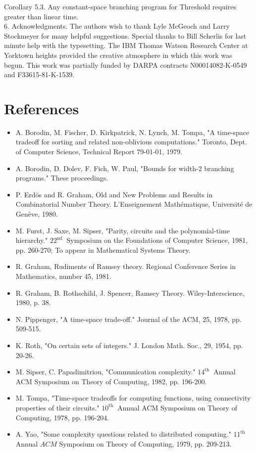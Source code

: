 \documentclass[10pt]{article}
\begin{document}
Corollary 5.3. Any constant-space branching program for Threshold requires greater than linear time.\\
6. Acknowledgments. The authors wish to thank Lyle McGeoch and Larry Stockmeyer for many helpful suggestions. Special thanks to Bill Scherlis for last minute help with the typesetting. The IBM Thomas Watson Research Center at Yorktown heights provided the creative atmosphere in which this work was begun. This work was partially funded by DARPA contracts N00014082-K-0549 and F33615-81-K-1539.

\section*{References}
\begin{itemize}
  \item[] [B] A. Borodin, M. Fischer, D. Kirkpatrick, N. Lynch, M. Tompa, "A time-space tradeoff for sorting and related non-oblivious computations." Toronto, Dept. of Computer Science, Technical Report 79-01-01, 1979.
  \item[] [BD] A. Borodin, D. Dolev, F. Fich, W. Paul, "Bounds for width-2 branching programs." These proceedings.
  \item[] [EG] P. Erdös and R. Graham, Old and New Problems and Results in Combinatorial Number Theory. L'Enseignement Mathématique, Université de Genève, 1980.
  \item[] [FSS] M. Furst, J. Saxe, M. Sipser, "Parity, circuits and the polynomial-time hierarchy." $22^{\text {nd }}$ Symposium on the Foundations of Computer Science, 1981, pp. 260-270; To appear in Mathematical Systems Theory.
  \item[] [G] R. Graham, Rudiments of Ramsey theory. Regional Conference Series in Mathematics, number 45, 1981.
  \item[] [GRS] R. Graham, B. Rothschild, J. Spencer, Ramsey Theory. Wiley-Interscience, 1980, p. 38.
  \item[] [P] N. Pippenger, "A time-space trade-off." Journal of the ACM, 25, 1978, pp. 509-515.
  \item[] [R] K. Roth, "On certain sets of integers." J. London Math. Soc., 29, 1954, pp. 20-26.
  \item[] [SP] M. Sipser, C. Papadimitriou, "Communication complexity." $14^{\text {th }}$ Annual ACM Symposium on Theory of Computing, 1982, pp. 196-200.
  \item[] [T] M. Tompa, "Time-space tradeoffs for computing functions, using connectivity properties of their circuits." $10^{\text {th }}$ Annual ACM Symposium on Theory of Computing, 1978, pp. 196-204.
  \item[] [Y] A. Yao, "Some complexity questions related to distributed computing." $11^{\text {th }}$ Annual $A C M$ Symposium on Theory of Computing, 1979, pp. 209-213.
\end{itemize}
\end{document}
